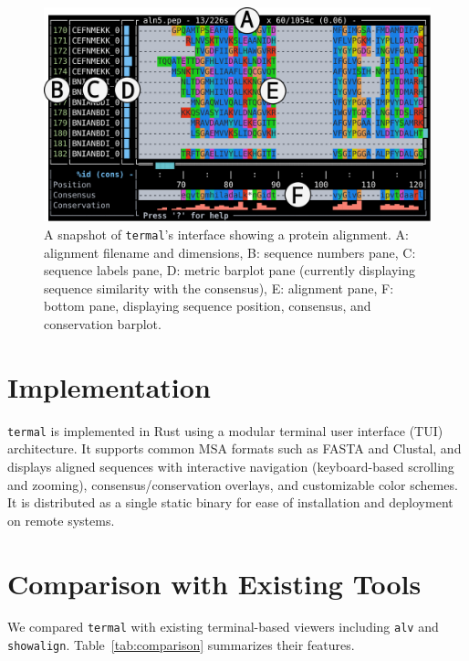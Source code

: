 \documentclass[11pt]{article}
\begin{document}
\begin{figure}[htbp]
\centering
	\includegraphics[width=\textwidth]{figure-1.pdf}
\caption{%
	A snapshot of \texttt{termal}'s interface showing a protein alignment. A:
	alignment filename and dimensions, B: sequence numbers pane, C: sequence
	labels pane, D: metric barplot pane (currently displaying sequence similarity
	with the consensus), E: alignment pane, F: bottom pane, displaying sequence
	position, consensus, and conservation barplot. \\
	}
\end{figure}


\section*{Implementation}

\texttt{termal} is implemented in Rust using a modular terminal user interface
(TUI) architecture. It supports common MSA formats such as FASTA and Clustal,
and displays aligned sequences with interactive navigation (keyboard-based
scrolling and zooming), consensus/conservation overlays, and customizable color
schemes. It is distributed as a single static binary for ease of installation
and deployment on remote systems.

\section*{Comparison with Existing Tools}

We compared \texttt{termal} with existing terminal-based viewers including
\texttt{alv} and \texttt{showalign}. Table~\ref{tab:comparison} summarizes their
features.
\end{document}
